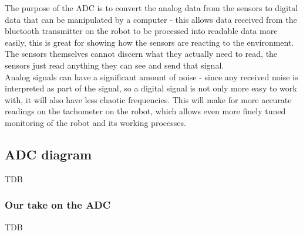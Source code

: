 The purpose of the ADC is to convert the analog data from the sensors to digital data that can be manipulated by a computer - this allows data received from the bluetooth transmitter on the robot to be processed into readable data more easily, this is great for showing how the sensors are reacting to the environment. The sensors themselves cannot discern what they actually need to read, the sensors just read anything they can see and send that signal. \\
Analog signals can have a significant amount of noise - since any received noise is interpreted as part of the signal, so a digital signal is not only more easy to work with, it will also have less chaotic frequencies. This will make for more accurate readings on the tachometer on the robot, which allows even more finely tuned monitoring of the robot and its working processes. \\

\subsection{ADC diagram} 
TDB

\subsubsection{Our take on the ADC}
TDB
